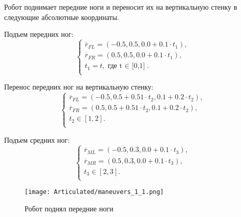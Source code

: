 Робот поднимает передние ноги и переносит их на вертикальную стенку в следующие абсолютные координаты.


Подъем передних ног:
\begin{equation}
\left\{
    \label{articulated:phase_1_lift_off}
    \begin{alignedat}{3}
      \overline{r}_{FL} = (-0.5, 0.5, 0.0 + 0.1\cdot t_1),\\
      \overline{r}_{FR} = (0.5, 0.5, 0.0 + 0.1\cdot t_1),\\
      t_1 = t, \text{где t $\in$ [0,1]}.\\
    \end{alignedat}
\right.
\end{equation}




Перенос передних ног на вертикальную стенку:
\begin{equation}
\left\{
  \label{articulated:phase_1_transition}
  \begin{alignedat}{3}
      \overline{r}_{FL} = (-0.5, 0.5 + 0.51\cdot t_2, 0.1 + 0.2\cdot t_2),\\
      \overline{r}_{FR} = (0.5, 0.5 + 0.51\cdot t_2, 0.1 + 0.2\cdot t_2),\\
      t_2 \in [1,2].\\
    \end{alignedat}
\right.
\end{equation}


Подъем средних ног:
\begin{equation}
\left\{
  \begin{alignedat}{3}
      \overline{r}_{ML} = (-0.5, 0.3, 0.0 + 0.1\cdot t_3),\\
      \overline{r}_{MR} = (0.5, 0.3, 0.0 + 0.1\cdot t_3),\\
      t_3 \in [2,3].\\
  \end{alignedat}
\right.
\end{equation}

\begin{figure}[ht]
  \centering
  \texttt{[image: Articulated/maneuvers\_1\_1.png]}
  \caption{Робот поднял передние ноги}
\end{figure}

